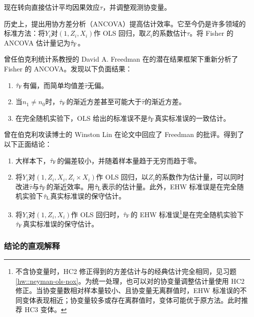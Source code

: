现在转向直接估计平均因果效应$\tau$，并调整观测协变量。 

历史上，\citet{fisher1925statistical}提出用协方差分析（ANCOVA）提高估计效率。它至今仍是许多领域的标准方法：将$Y_i$对$(1, Z_i, X_i)$作 OLS 回归，取$Z_i$的系数估计$\tau$。将 Fisher 的 ANCOVA 估计量记为$\hat{\tau}_\textsc{F}$。 


曾任伯克利统计系教授的 David A. Freedman 在\citet{Neyman:1923}的潜在结果框架下重新分析了 Fisher 的 ANCOVA。\citet{freedman2008regression_a, freedman2008regression_b}发现以下负面结果：
\begin{enumerate}
[(1)]
\item
$\hat{\tau}_\textsc{F}$有偏，而简单均值差$\hat{\tau}$无偏。
\item 
当$n_1\neq n_0$时，$\hat{\tau}_\textsc{F}$的渐近方差甚至可能大于$\hat{\tau}$的渐近方差。
\item 
在完全随机实验下，OLS 给出的标准误不是$\hat{\tau}_\textsc{F}$真实标准误的一致估计。   
\end{enumerate}


曾在伯克利攻读博士的 Winston Lin 在论文中回应了 Freedman 的批评。\citet{lin2013}得到了以下正面结论：
\begin{enumerate}
[(1)]
\item
大样本下，$\hat{\tau}_\textsc{F}$的偏差较小，并随着样本量趋于无穷而趋于零。
\item
将$Y_i$对$(1, Z_i, X_i, Z_i\times X_i)$作 OLS 回归，以$Z_i$的系数作为估计量，可以同时改进$\hat{\tau}$与$\hat{\tau}_\textsc{F}$的渐近效率。用$\hat{\tau}_\textsc{L}$表示\citet{lin2013}的估计量。此外，EHW 标准误是在完全随机实验下$\hat{\tau}_\textsc{L}$真实标准误的保守估计。 
\item
将$Y_i$对$(1, Z_i, X_i)$作 OLS 回归时，$\hat{\tau}_\textsc{F}$的 EHW 标准误\footnote{不含协变量时，HC2 修正得到的方差估计与\citet{Neyman:1923}的经典估计完全相同，见习题\ref{hw::neyman-ols-nox}。为统一处理，也可以对\citet{lin2013}的协变量调整估计量使用 HC2 修正。当协变量数相对样本量较小、且协变量无离群值时，EHW 标准误的不同变体表现相近；协变量较多或存在离群值时，变体可能优于原方法。此时\citet{lei2018regression}推荐 HC3 变体。}是在完全随机实验下$\hat{\tau}_\textsc{F}$真实标准误的保守估计。 
\end{enumerate}


\subsubsection{\citet{lin2013}结论的直观解释}



